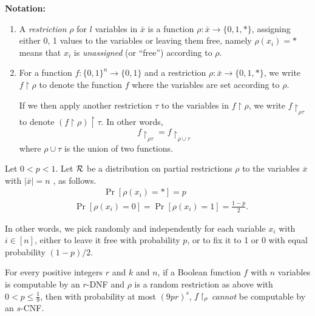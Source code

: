\textbf{Notation:} 
\begin{enumerate}
\item 
 A \textit{restriction} $\rho$ for $l$ variables in $\bar{x}$ is a function $\rho: \bar{x} \to \{0,1, *\}$, assigning either 0, 1 values to the variables or leaving them free, namely $\rho(x_i) = *$ means that $x_i$ is \textit{unassigned} (or ``free'') according to $\rho$.

 
\item For a function $f: \{0,1\}^n \to \{0,1\}$ and a   restriction $\rho: \bar{x} \to \{0,1, *\}$, we write $f\upharpoonright \rho$ to denote the function $f$ where the variables are set according to $\rho$.

If we then apply another restriction $\tau$ to the variables in $f\upharpoonright \rho$, we 
write $f\upharpoonright_{\rho\tau}$ to denote $(f\upharpoonright \rho)\upharpoonright \tau$. In other words,
\[
f\upharpoonright_{\rho\tau} = f\upharpoonright_{\rho \cup \tau}
\]
where $\rho \cup \tau$ is the union of two functions.
\end{enumerate}



\begin{tcolorbox}[colframe=white, colback=green!6, boxrule=0mm, sharp corners]
\begin{definition}\label{def:random-rest}
 Let $0< p<1$.
Let $\mathcal{R}$ be a distribution on partial restrictions $\rho$ to the variables $\overline{x}$ with $|\overline{x}|=n$ , as follows.
$$
\begin{aligned}
& ~~~~~~~~~~~ \quad \operatorname{Pr}\left[\rho\left(x_i\right)=*\right]=p \\
& \operatorname{Pr}\left[\rho\left(x_i\right)=0\right]=\operatorname{Pr}\left[\rho\left(x_i\right)=1\right]=\frac{1-p}{2}.
\end{aligned}
$$
\end{definition}
\end{tcolorbox}
In other words, we pick randomly and independently for each variable $x_i$ with $i\in[n]$, either to leave it free with probability $p$, or to fix it to 1 or 0 with equal probability $(1-p)/2$.


\begin{tcolorbox}[colframe=white, colback=blue!5, boxrule=0mm, sharp corners]
\begin{theorem}\label{thm:Switching-Lemma}
For every positive integers $r$ and $k$ and $n$, if a Boolean function $f$ with $n$ variables is computable by an $r$-DNF and $\rho$ is a random restriction as above with $0<p \leq \frac{1}{9}$, then with probability at most $(9pr)^s$, $f\!\upharpoonright_\rho$ \emph{cannot} be computable by  an $s$-CNF.
\end{theorem}
\end{tcolorbox}

